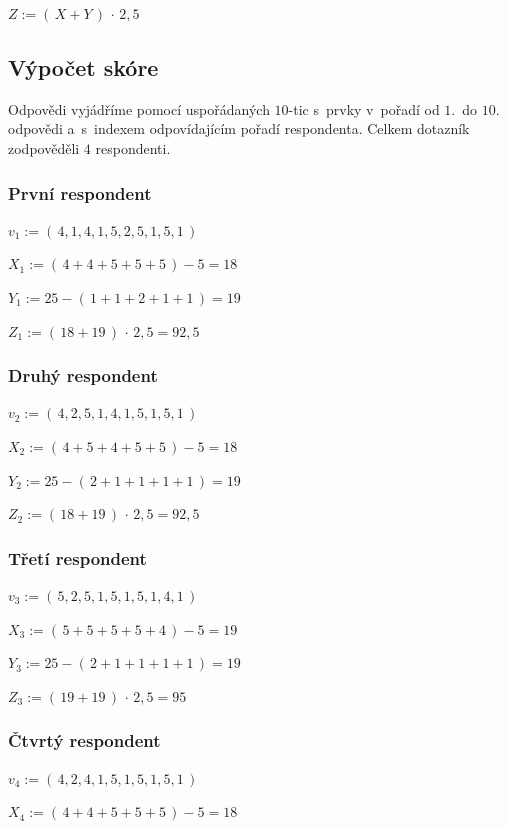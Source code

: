 \documentclass[12pt,a4paper]{report}
\begin{document}
$Z := ( \,X + Y\,)\,\cdot\,2,5$

\subsection{Výpočet skóre}

Odpovědi vyjádříme pomocí uspořádaných $10$-tic s~prvky v~pořadí od $1$.~do $10$. odpovědi a~s~indexem odpovídajícím pořadí respondenta. Celkem dotazník zodpověděli $4$ respondenti.

\subsubsection{První respondent}

$v_1 := (\,4,1,4,1,5,2,5,1,5,1\,)$

$X_1 := (\,4 + 4 + 5 + 5 + 5\,) - 5 = 18\,$

$Y_1 := 25 - (\,1 + 1 + 2 + 1 + 1\,) = 19\,$

$Z_1 := ( \,18 + 19\,)\,\cdot\,2,5 = 92,5$

\subsubsection{Druhý respondent}

$v_2 := (\,4,2,5,1,4,1,5,1,5,1\,)$

$X_2 := (\,4 + 5 + 4 + 5 + 5\,) - 5 = 18\,$

$Y_2 := 25 - (\,2 + 1 + 1 + 1 + 1\,) = 19\,$

$Z_2 := ( \,18 + 19\,)\,\cdot\,2,5 = 92,5$

\subsubsection{Třetí respondent}

$v_3 := (\,5,2,5,1,5,1,5,1,4,1\,)$

$X_3 := (\,5 + 5 + 5 + 5 + 4\,) - 5 = 19\,$

$Y_3 := 25 - (\,2 + 1 + 1 + 1 + 1\,) = 19\,$

$Z_3 := ( \,19 + 19\,)\,\cdot\,2,5 = 95$

\subsubsection{Čtvrtý respondent}

$v_4 := (\,4,2,4,1,5,1,5,1,5,1\,)$

$X_4 := (\,4 + 4 + 5 + 5 + 5\,) - 5 = 18\,$
\end{document}
